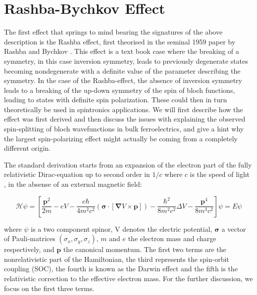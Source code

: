 \section{Rashba-Bychkov Effect}
The first effect that springs to mind bearing the signatures of the above description is the Rashba effect, first theorised in the seminal 1959 paper by Rashba and Bychkov \cite{Rashba1959SymmetryAr}. This effect is a text book case where the breaking of a symmetry, in this case inversion symmetry, leads to previously degenerate states becoming nondegenerate with a definite value of the parameter describing the symmetry. In the case of the Rashba-effect, the absence of inversion symmetry leads to a breaking of the up-down symmetry of the spin of bloch functions, leading to states with definite spin polarization. These could then in turn theoretically be used in spintronics applications.
We will first describe how the effect was first derived and then discuss the issues with explaining the observed spin-splitting of bloch wavefunctions in bulk ferroelectrics, and give a hint why the largest spin-polarizing effect might actually be coming from a completely different origin. 

The standard derivation starts from an expansion of the electron part of the fully relativistic Dirac-equation up to second order in $1/c$ where $c$ is the speed of light \cite{Rashba1959SymmetryAr}, in the absense of an external magnetic field:

\begin{equation}
	\mathcal{H} \psi = \left[\frac{\bm{p}^2}{2m} - e V - \frac{e \hbar}{4m^2c^2}(\bm{\sigma}\cdot[\bm{\nabla}V \times \bm{p}]) - \frac{\hbar^2}{8m^2c^2} \Delta V - \frac{\bm{p}^4}{8m^3c^2}\right]\psi = E\psi
\end{equation}

where $\psi$ is a two component spinor, V denotes the electric potential, $\bm{\sigma}$ a vector of Pauli-matrices $(\sigma_x, \sigma_y, \sigma_z)$, $m$ and $e$ the electron mass and charge respectively, and $\bm{p}$ the canonical momentum. The first two terms are the nonrelativistic part of the Hamiltonian, the third represents the spin-orbit coupling (SOC), the fourth is known as the Darwin effect and the fifth is the relativistic correction to the effective electron mass. For the further discussion, we focus on the first three terms.


